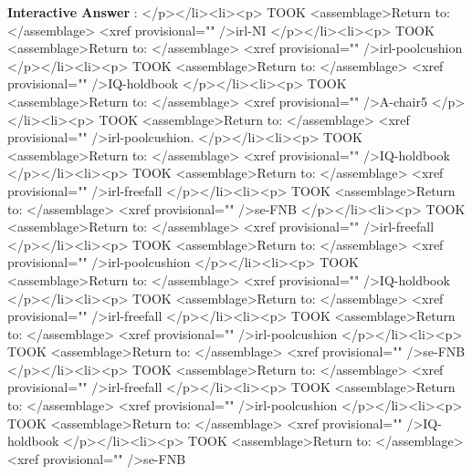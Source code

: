 \documentclass[11pt,letter,openany,makeidx]{book}
\newcounter{AtIQ}
\renewcommand{\theAtIQ}{Answer \arabic{AtIQ}}
\newenvironment{AIQ}{\begin{list}{\textbf{Interactive \theAtIQ}:}{\usecounter{AtIQ} \leftmargin 12pt}}{\end{list}}
\begin{document}
\begin{AIQ}
</p></li><li><p>\label{A-chair8} TOOK <assemblage>Return to: </assemblage> <xref provisional="" />{irl-NI}
</p></li><li><p>\label{A-pool-roll} TOOK <assemblage>Return to: </assemblage> <xref provisional="" />{irl-poolcushion}
</p></li><li><p>\label{A-landedN} TOOK <assemblage>Return to: </assemblage> <xref provisional="" />{IQ-holdbook}
</p></li><li><p>\label{A-FT} TOOK  <assemblage>Return to: </assemblage> <xref provisional="" />{A-chair5}
</p></li><li><p>\label{A-pool-bumper} TOOK <assemblage>Return to: </assemblage> <xref provisional="" />{irl-poolcushion}.
</p></li><li><p>\label{A-zero} TOOK <assemblage>Return to: </assemblage> <xref provisional="" />{IQ-holdbook}
</p></li><li><p>\label{A-firstfall} TOOK  <assemblage>Return to: </assemblage> <xref provisional="" />{irl-freefall}
</p></li><li><p>\label{A-floor}  TOOK  <assemblage>Return to: </assemblage> <xref provisional="" />{se-FNB}
</p></li><li><p>\label{A-firstwhy} TOOK  <assemblage>Return to: </assemblage> <xref provisional="" />{irl-freefall}
</p></li><li><p>\label{A-noncue} TOOK <assemblage>Return to: </assemblage> <xref provisional="" />{irl-poolcushion}
</p></li><li><p>\label{A-one} TOOK  <assemblage>Return to: </assemblage> <xref provisional="" />{IQ-holdbook}
</p></li><li><p>\label{A-fallv} TOOK  <assemblage>Return to: </assemblage> <xref provisional="" />{irl-freefall}
</p></li><li><p>\label{A-pool-spin} TOOK <assemblage>Return to: </assemblage> <xref provisional="" />{irl-poolcushion}
</p></li><li><p>\label{A-second} TOOK  <assemblage>Return to: </assemblage> <xref provisional="" />{se-FNB}
</p></li><li><p>\label{A-falla} TOOK  <assemblage>Return to: </assemblage> <xref provisional="" />{irl-freefall}
</p></li><li><p>\label{A-pool-later} TOOK <assemblage>Return to: </assemblage> <xref provisional="" />{irl-poolcushion}
</p></li><li><p>\label{A-two} TOOK  <assemblage>Return to: </assemblage> <xref provisional="" />{IQ-holdbook}
</p></li><li><p>\label{A-third} TOOK  <assemblage>Return to: </assemblage> <xref provisional="" />{se-FNB}


\end{AIQ}
\end{document}
